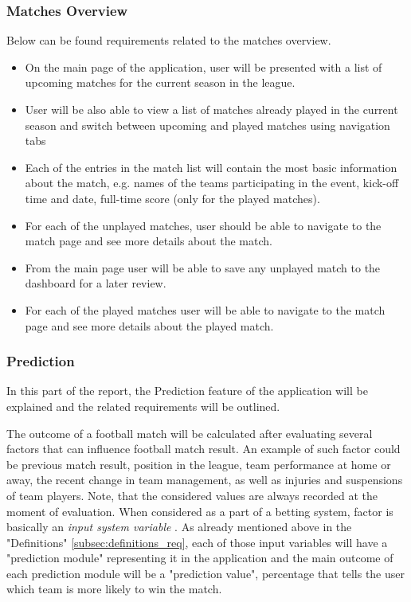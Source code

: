 \subsubsection{Matches Overview}
\label{subsubsec:matchesoverview_req}
Below can be found requirements related to the matches overview.
\begin{itemize}
	\item On the main page of the application, user will be presented with a list of upcoming matches for the current season in the league.
    \item User will be also able to view a list of matches already played in the current season and switch between upcoming and played matches using navigation tabs
   \item Each of the entries in the match list will contain the most basic information about the match, e.g. names of the teams participating in the event, kick-off time and date, full-time score (only for the played matches).
   \item For each of the unplayed matches, user should be able to navigate to the match page and see more details about the match.
  \item From the main page user will be able to save any unplayed match to the dashboard for a later review.
  \item For each of the played matches user will be able to navigate to the match page and see more details about the played match.
\end{itemize}

\subsubsection{Prediction}
\label{subsubsec:prediction_req}
In this part of the report, the Prediction feature of the application will be explained and the related requirements will be outlined.

The outcome of a football match will be calculated after evaluating several factors that can influence football match result. An example of such factor could be previous match result, position in the league, team performance at home or away, the recent change in team management, as well as injuries and suspensions of team players.  Note, that the considered values are always recorded at the moment of evaluation.  When considered as a part of a betting system, factor is basically an \emph{input system variable} \cite{art:simplebettingsystem}. As already mentioned above in the "Definitions" \ref{subsec:definitions_req}, each of those input variables will have a "prediction module" representing it in the application and the main outcome of each prediction module will be a "prediction value", percentage that tells the user which team is more likely to win the match.

